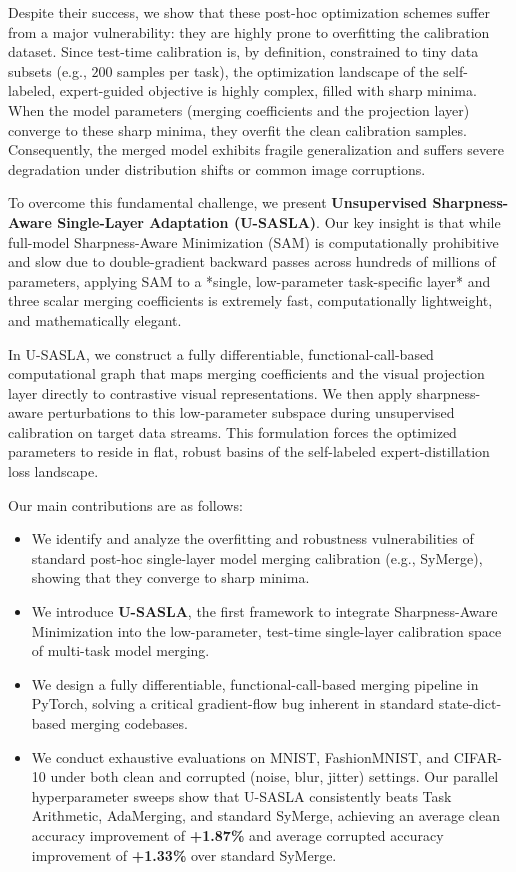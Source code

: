 \documentclass{article}
\theoremstyle{plain}
\theoremstyle{definition}
\theoremstyle{remark}
\begin{document}
Despite their success, we show that these post-hoc optimization schemes suffer from a major vulnerability: they are highly prone to overfitting the calibration dataset. Since test-time calibration is, by definition, constrained to tiny data subsets (e.g., $200$ samples per task), the optimization landscape of the self-labeled, expert-guided objective is highly complex, filled with sharp minima. When the model parameters (merging coefficients and the projection layer) converge to these sharp minima, they overfit the clean calibration samples. Consequently, the merged model exhibits fragile generalization and suffers severe degradation under distribution shifts or common image corruptions.

To overcome this fundamental challenge, we present \textbf{Unsupervised Sharpness-Aware Single-Layer Adaptation (U-SASLA)}. Our key insight is that while full-model Sharpness-Aware Minimization (SAM) \cite{sam, asam, gsam, esam, swad, fisher_sam} is computationally prohibitive and slow due to double-gradient backward passes across hundreds of millions of parameters, applying SAM to a *single, low-parameter task-specific layer* and three scalar merging coefficients is extremely fast, computationally lightweight, and mathematically elegant.

In U-SASLA, we construct a fully differentiable, functional-call-based computational graph that maps merging coefficients and the visual projection layer directly to contrastive visual representations. We then apply sharpness-aware perturbations to this low-parameter subspace during unsupervised calibration on target data streams. This formulation forces the optimized parameters to reside in flat, robust basins of the self-labeled expert-distillation loss landscape. 

Our main contributions are as follows:
\begin{itemize}
    \item We identify and analyze the overfitting and robustness vulnerabilities of standard post-hoc single-layer model merging calibration (e.g., SyMerge), showing that they converge to sharp minima.
    \item We introduce \textbf{U-SASLA}, the first framework to integrate Sharpness-Aware Minimization into the low-parameter, test-time single-layer calibration space of multi-task model merging.
    \item We design a fully differentiable, functional-call-based merging pipeline in PyTorch, solving a critical gradient-flow bug inherent in standard state-dict-based merging codebases.
    \item We conduct exhaustive evaluations on MNIST, FashionMNIST, and CIFAR-10 under both clean and corrupted (noise, blur, jitter) settings. Our parallel hyperparameter sweeps show that U-SASLA consistently beats Task Arithmetic, AdaMerging, and standard SyMerge, achieving an average clean accuracy improvement of \textbf{+1.87\%} and average corrupted accuracy improvement of \textbf{+1.33\%} over standard SyMerge.
\end{itemize}
\end{document}
